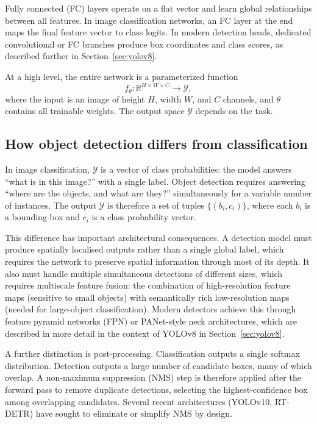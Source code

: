 \documentclass[12pt,a4paper]{report}
\begin{document}
Fully connected (FC) layers operate on a flat vector and learn global relationships between all features.
In image classification networks, an FC layer at the end maps the final feature vector to class logits.
In modern detection heads, dedicated convolutional or FC branches produce box coordinates and class scores, as
described further in Section~\ref{sec:yolov8}.

At a high level, the entire network is a parameterized function
\[
  f_\theta : \mathbb{R}^{H \times W \times C} \rightarrow \mathcal{Y},
\]
where the input is an image of height $H$, width $W$, and $C$ channels, and $\theta$ contains all trainable weights.
The output space $\mathcal{Y}$ depends on the task.

\subsection*{How object detection differs from classification}

In image classification, $\mathcal{Y}$ is a vector of class probabilities: the model answers ``what is in
this image?'' with a single label.
Object detection requires answering ``where are the objects, and what are they?'' simultaneously for a variable
number of instances.
The output $\mathcal{Y}$ is therefore a set of tuples $\{(b_i, c_i)\}$, where each $b_i$ is a bounding box
and $c_i$ is a class probability vector.

This difference has important architectural consequences.
A detection model must produce spatially localised outputs rather than a single global label, which requires the
network to preserve spatial information through most of its depth.
It also must handle multiple simultaneous detections of different sizes, which requires multiscale feature
fusion: the combination of high-resolution feature maps (sensitive to small objects) with semantically rich
low-resolution maps (needed for large-object classification).
Modern detectors achieve this through feature pyramid networks (FPN) or PANet-style neck architectures, which
are described in more detail in the context of YOLOv8 in Section~\ref{sec:yolov8}.

A further distinction is post-processing.
Classification outputs a single softmax distribution.
Detection outputs a large number of candidate boxes, many of which overlap.
A non-maximum suppression (NMS) step is therefore applied after the forward pass to remove duplicate detections,
selecting the highest-confidence box among overlapping candidates.
Several recent architectures (YOLOv10, RT-DETR) have sought to eliminate or simplify NMS by design.
\end{document}
